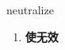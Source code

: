 
\begin{frame}
{\huge neutralize}
\begin{center}
\begin{enumerate}\Large
  \item \textbf{使无效}
\end{enumerate}
\end{center}
\end{frame}

